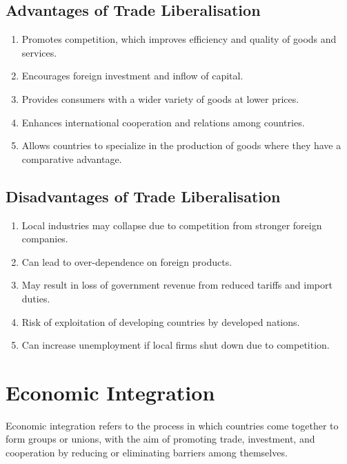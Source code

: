 \documentclass[12pt,a4paper, openany]{book}
\begin{document}
\subsection{Advantages of Trade Liberalisation}
\begin{enumerate}
	\item Promotes competition, which improves efficiency and quality of goods and services.
	\item Encourages foreign investment and inflow of capital.
	\item Provides consumers with a wider variety of goods at lower prices.
	\item Enhances international cooperation and relations among countries.
	\item Allows countries to specialize in the production of goods where they have a comparative advantage.
\end{enumerate}

\subsection{Disadvantages of Trade Liberalisation}
\begin{enumerate}
	\item Local industries may collapse due to competition from stronger foreign companies.
	\item Can lead to over-dependence on foreign products.
	\item May result in loss of government revenue from reduced tariffs and import duties.
	\item Risk of exploitation of developing countries by developed nations.
	\item Can increase unemployment if local firms shut down due to competition.
\end{enumerate}

\section{Economic Integration}
Economic integration refers to the process in which countries come together to form groups or unions,
with the aim of promoting trade, investment, and cooperation by reducing or eliminating barriers among themselves.
\end{document}
